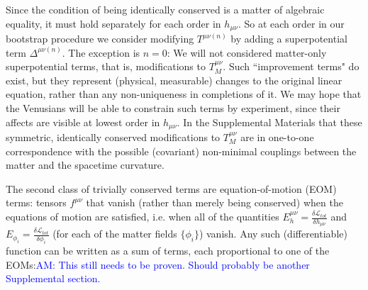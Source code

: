 \documentclass[aps,physrev,preprint,groupedaddress]{revtex4-2}
\newcommand{\AM}[1]{\textcolor{blue}{AM: #1}}
\begin{document}
Since the condition of being identically conserved is a matter of algebraic equality, it must hold separately for each order in \(h_{\mu\nu}\). So at each order in our bootstrap procedure we consider modifying \(T^{\mu\nu(n)}\) by adding a superpotential term \(\Delta^{\mu\nu(n)}\). The exception is \(n=0\): We will not considered matter-only superpotential terms, that is, modifications to \(T_M^{\mu\nu}\). Such ``improvement terms" do exist, but they represent (physical, measurable) changes to the original linear equation, rather than any non-uniqueness in completions of it. We may hope that the Venusians will be able to constrain such terms by experiment, since their affects are visible at lowest order in \(h_{\mu\nu}\). In the  Supplemental Materials that these symmetric, identically conserved modifications to \(T_M^{\mu\nu}\) are in one-to-one correspondence with the possible (covariant) non-minimal couplings between the matter and the spacetime curvature. 

The second class of trivially conserved terms are equation-of-motion (EOM) terms: tensors \(f^{\mu\nu}\) that vanish (rather than merely being conserved) when the equations of motion are satisfied, i.e. when all of the quantities \(E_h^{\mu\nu}=\frac{\delta\mathcal{L}_{tot}}{\delta h_{\mu\nu}}\) and \(E_{\phi_i}=\frac{\delta\mathcal{L}_{tot}}{\delta \phi_i}\) (for each of the matter fields \(\{\phi_i\}\)) vanish. Any such (differentiable) function can be written as a sum of terms, each proportional to one of the EOMs:\AM{This still needs to be proven. Should probably be another Supplemental section.}
\end{document}
